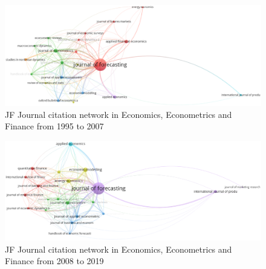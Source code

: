 \documentclass[11pt,a4paper]{elsarticle} %
\begin{document}
\begin{figure}[htbp]
\centering
\includegraphics[scale=0.3]{fig.24.eps}
\caption{JF Journal citation network in Economics, Econometrics and Finance from 1995 to 2007}
\end{figure}

\begin{figure}[htbp]
\centering
\includegraphics[scale=0.3]{fig.25.eps}
\caption{JF Journal citation network in Economics, Econometrics and Finance from 2008 to 2019}
\end{figure}
\end{document}
